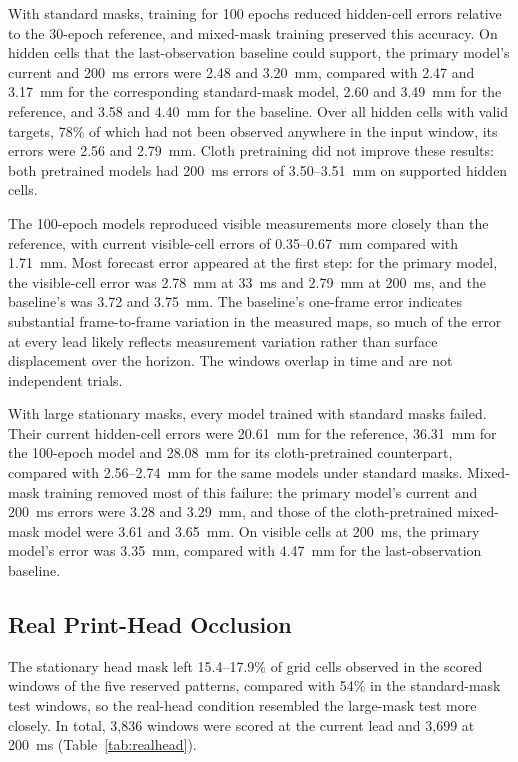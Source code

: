 With standard masks, training for 100 epochs reduced hidden-cell errors relative to the 30-epoch reference, and mixed-mask training preserved this accuracy. On hidden cells that the last-observation baseline could support, the primary model's current and 200~ms errors were 2.48 and 3.20~mm, compared with 2.47 and 3.17~mm for the corresponding standard-mask model, 2.60 and 3.49~mm for the reference, and 3.58 and 4.40~mm for the baseline. Over all hidden cells with valid targets, 78\% of which had not been observed anywhere in the input window, its errors were 2.56 and 2.79~mm. Cloth pretraining did not improve these results: both pretrained models had 200~ms errors of 3.50--3.51~mm on supported hidden cells.

The 100-epoch models reproduced visible measurements more closely than the reference, with current visible-cell errors of 0.35--0.67~mm compared with 1.71~mm. Most forecast error appeared at the first step: for the primary model, the visible-cell error was 2.78~mm at 33~ms and 2.79~mm at 200~ms, and the baseline's was 3.72 and 3.75~mm. The baseline's one-frame error indicates substantial frame-to-frame variation in the measured maps, so much of the error at every lead likely reflects measurement variation rather than surface displacement over the horizon. The windows overlap in time and are not independent trials.

With large stationary masks, every model trained with standard masks failed. Their current hidden-cell errors were 20.61~mm for the reference, 36.31~mm for the 100-epoch model and 28.08~mm for its cloth-pretrained counterpart, compared with 2.56--2.74~mm for the same models under standard masks. Mixed-mask training removed most of this failure: the primary model's current and 200~ms errors were 3.28 and 3.29~mm, and those of the cloth-pretrained mixed-mask model were 3.61 and 3.65~mm. On visible cells at 200~ms, the primary model's error was 3.35~mm, compared with 4.47~mm for the last-observation baseline.

\subsection{Real Print-Head Occlusion}
The stationary head mask left 15.4--17.9\% of grid cells observed in the scored windows of the five reserved patterns, compared with 54\% in the standard-mask test windows, so the real-head condition resembled the large-mask test more closely. In total, 3,836 windows were scored at the current lead and 3,699 at 200~ms (Table~\ref{tab:realhead}).

